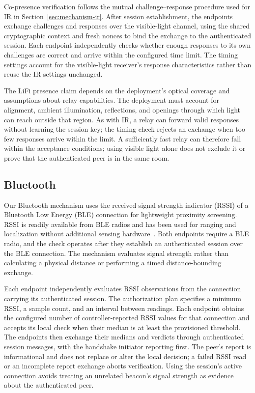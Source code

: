 \documentclass[sigconf,authordraft]{acmart}
\begin{document}
Co-presence verification follows the mutual challenge--response procedure used for IR in Section~\ref{sec:mechanism-ir}.
After session establishment, the endpoints exchange challenges and responses over the visible-light channel, using the shared cryptographic context and fresh nonces to bind the exchange to the authenticated session.
Each endpoint independently checks whether enough responses to its own challenges are correct and arrive within the configured time limit.
The timing settings account for the visible-light receiver's response characteristics rather than reuse the IR settings unchanged.

The LiFi presence claim depends on the deployment's optical coverage and assumptions about relay capabilities.
The deployment must account for alignment, ambient illumination, reflections, and openings through which light can reach outside that region.
As with IR, a relay can forward valid responses without learning the session key; the timing check rejects an exchange when too few responses arrive within the limit.
A sufficiently fast relay can therefore fall within the acceptance conditions; using visible light alone does not exclude it or prove that the authenticated peer is in the same room.

\subsection{Bluetooth}
\label{sec:mechanism-bluetooth}

Our Bluetooth mechanism uses the received signal strength indicator (RSSI) of a Bluetooth Low Energy (BLE) connection for lightweight proximity screening.
RSSI is readily available from BLE radios and has been used for ranging and localization without additional sensing hardware~\cite{giovanelli2018rssi,faragher2015location}.
Both endpoints require a BLE radio, and the check operates after they establish an authenticated session over the BLE connection.
The mechanism evaluates signal strength rather than calculating a physical distance or performing a timed distance-bounding exchange.

Each endpoint independently evaluates RSSI observations from the connection carrying its authenticated session.
The authorization plan specifies a minimum RSSI, a sample count, and an interval between readings.
Each endpoint obtains the configured number of controller-reported RSSI values for that connection and accepts its local check when their median is at least the provisioned threshold.
The endpoints then exchange their medians and verdicts through authenticated session messages, with the handshake initiator reporting first.
The peer's report is informational and does not replace or alter the local decision; a failed RSSI read or an incomplete report exchange aborts verification.
Using the session's active connection avoids treating an unrelated beacon's signal strength as evidence about the authenticated peer.
\end{document}
